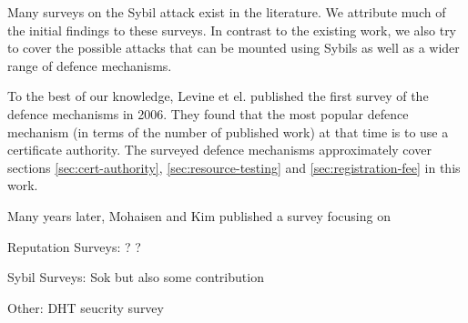 Many surveys on the Sybil attack exist in the literature. We attribute much of
the initial findings to these surveys. In contrast to the existing work,
we also try to cover the possible attacks that can be mounted using Sybils as
well as a wider range of defence mechanisms.

To the best of our knowledge, Levine et el. published the first survey of the
defence mechanisms\cite{marti2006taxonomy} in 2006. They found that the most
popular defence mechanism (in terms of the number of published work) at that
time is to use a certificate authority. The surveyed defence mechanisms
approximately cover sections \ref{sec:cert-authority},
\ref{sec:resource-testing} and \ref{sec:registration-fee} in this work.

Many years later, Mohaisen and Kim published a survey focusing on 

Reputation Surveys:
\cite{marti2006taxonomy}
\cite{josang2007survey} ?
\cite{hoffman2009survey}
\cite{koutrouli2012taxonomy}
\cite{selvaraj2012survey} ?
\cite{hendrikx2015reputation}

Sybil Surveys:
\cite{mohaisen2013sybil}
\cite{rakesh2014survey}
\cite{gunturu2015survey}
\cite{koll2014state}
Sok\cite{alvisi2013sok} but also some contribution

Other:
\cite{wallach2003survey}
DHT seucrity survey\cite{urdaneta2011survey}

